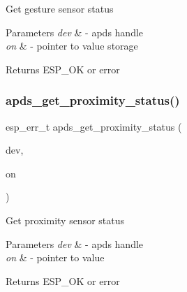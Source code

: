 \begin{DoxyItemize}
\item Get gesture sensor status 
\end{DoxyItemize}


\begin{DoxyParams}{Parameters}
{\em dev} & -\/ apds handle \\
\hline
{\em on} & -\/ pointer to value storage \\
\hline
\end{DoxyParams}
\begin{DoxyReturn}{Returns}
E\+S\+P\+\_\+\+OK or error 
\end{DoxyReturn}
\mbox{\label{group__APDS9960__SetStatusFunctions_ga9982b51fc7247fe03068e0e88d9d54af}} 
\subsubsection{\texorpdfstring{apds\+\_\+get\+\_\+proximity\+\_\+status()}{apds\_get\_proximity\_status()}}
{\footnotesize\ttfamily esp\+\_\+err\+\_\+t apds\+\_\+get\+\_\+proximity\+\_\+status (\begin{DoxyParamCaption}\item[{\hyperlink{structAPDS9960__Driver}{A\+P\+D\+S\+\_\+\+D\+EV}}]{dev,  }\item[{\hyperlink{vl53l0x__types_8h_aba7bc1797add20fe3efdf37ced1182c5}{uint8\+\_\+t} $\ast$}]{on }\end{DoxyParamCaption})}




\begin{DoxyItemize}
\item Get proximity sensor status 
\end{DoxyItemize}


\begin{DoxyParams}{Parameters}
{\em dev} & -\/ apds handle \\
\hline
{\em on} & -\/ pointer to value \\
\hline
\end{DoxyParams}
\begin{DoxyReturn}{Returns}
E\+S\+P\+\_\+\+OK or error 
\end{DoxyReturn}
\mbox{\label{group__APDS9960__SetStatusFunctions_gaebd3fa7ba4aa12ccc0bba6cb55cf3062}} 
